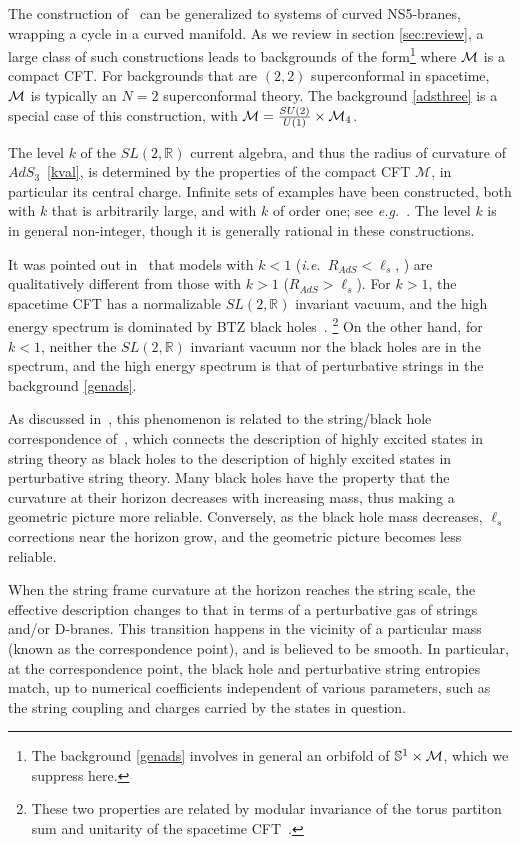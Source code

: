 \documentclass[12pt]{article}
\def\sltwo{\ensuremath{SL(2,\bR)}}
\def\ie{{i.e.}}
\def\eg{{e.g.}}
\def\lstr{\ell_{\textit{s}}}
\def\MM{{\mathcal{M}}}
\newcommand{\bR}{{\mathbb R}}
\newcommand{\bS}{{\mathbb S}}
\numberwithin{equation}{section}
\def\cM{\mathcal {M}} \def\cN{\mathcal {N}} \def\cO{\mathcal {O}}
\def\ie{{\it i.e.}}
\def\eg{{\it e.g.}}
\def\MM{{\cal M}}
\def\ie{{\it i.e.}}
\def\eg{{\it e.g.}}
\begin{document}
The construction of~ can be generalized to systems of curved NS5-branes, wrapping a cycle in a curved manifold. As we review in section \ref{sec:review}, a large class of such constructions leads to backgrounds of the form\footnote{The background \eqref{genads} involves in general an orbifold of $\bS^1\times \MM$, which we suppress here.}
\eqn[genads]{AdS_3\times \bS^1\times \MM~,}
where $\MM$ is a compact CFT. For backgrounds that are $(2,2)$ superconformal in spacetime, $\MM$ is typically an $N=2$ superconformal theory. The background \eqref{adsthree} is a special case of this construction, with $\MM=\frac{SU(2)}{U(1)}\times \cM_4$. 


The level $k$ of the $\sltwo$ current algebra, and thus the radius of curvature of $AdS_3$~\eqref{kval}, is determined by the properties of the compact CFT $\cM$, in particular its central charge. Infinite sets of examples have been constructed, both with $k$ that is arbitrarily large, and with $k$ of order one; see \eg~. 
The level $k$ is in general non-integer, though it is generally rational in these constructions. 

It was pointed out in~ that models with $k<1$ (\ie\ $R_{AdS}<\lstr$, \kval) are qualitatively different from those with $k>1$ ($R_{AdS}>\lstr$). For $k>1$, the spacetime CFT has a normalizable $\sltwo$ invariant vacuum, and the high energy spectrum is dominated by BTZ black holes~.%
\footnote{These two properties are related by modular invariance of the torus partiton sum and unitarity of the spacetime CFT~.}
On the other hand, for $k<1$, neither the $\sltwo$ invariant vacuum nor the black holes are in the spectrum, and the high energy spectrum is that of perturbative strings in the background \eqref{genads}.

As discussed in~, this phenomenon is related to the string/black hole correspondence of~, which connects the description of highly excited states in string theory as black holes to the description of highly excited states in perturbative string theory.  Many black holes have the property that the curvature at their horizon decreases with increasing mass, thus making a geometric picture more reliable. Conversely, as the black hole mass decreases, $\lstr$ corrections near the horizon grow, and the geometric picture becomes less reliable.  

When the string frame curvature at the horizon reaches the string scale, the effective description changes to that in terms of a perturbative gas of strings and/or D-branes. This transition happens in the vicinity of a particular mass (known as the correspondence point), and is believed to be smooth. In particular, at the correspondence point, the black hole and perturbative string entropies match, up to numerical coefficients independent of various parameters, such as the string coupling and charges carried by the states in question. 
\end{document}
